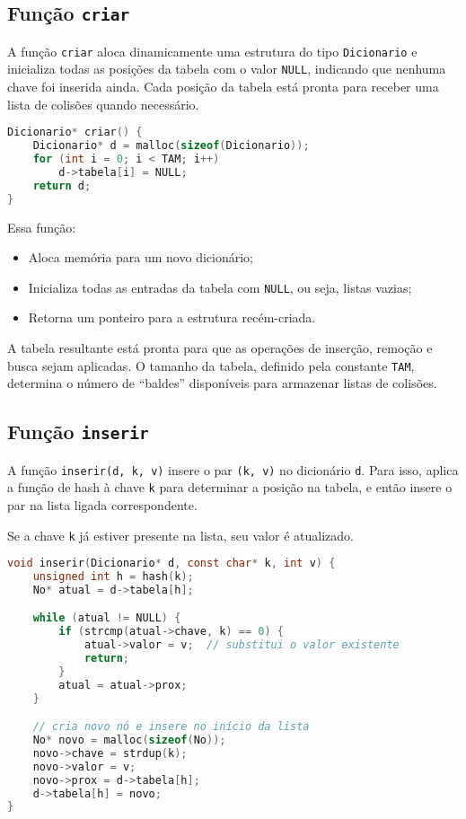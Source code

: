 \subsection*{Função \texttt{criar}}

A função \texttt{criar} aloca dinamicamente uma estrutura do tipo \texttt{Dicionario} e inicializa todas as posições da tabela com o valor \texttt{NULL}, indicando que nenhuma chave foi inserida ainda. 
Cada posição da tabela está pronta para receber uma lista de colisões quando necessário.

\begin{lstlisting}[language=C, caption={Criação de um dicionário vazio}]
Dicionario* criar() {
    Dicionario* d = malloc(sizeof(Dicionario));
    for (int i = 0; i < TAM; i++)
        d->tabela[i] = NULL;
    return d;
}
\end{lstlisting}

Essa função:

\begin{itemize}
  \item Aloca memória para um novo dicionário;
  \item Inicializa todas as entradas da tabela com \texttt{NULL}, ou seja, listas vazias;
  \item Retorna um ponteiro para a estrutura recém-criada.
\end{itemize}

A tabela resultante está pronta para que as operações de inserção, remoção e busca sejam aplicadas. 
O tamanho da tabela, definido pela constante \texttt{TAM}, determina o número de ``baldes'' disponíveis para armazenar listas de colisões.

\subsection*{Função \texttt{inserir}}

A função \texttt{inserir(d, k, v)} insere o par \texttt{(k, v)} no dicionário \texttt{d}. 
Para isso, aplica a função de hash à chave \texttt{k} para determinar a posição na tabela, e então insere o par na lista ligada correspondente.

Se a chave \texttt{k} já estiver presente na lista, seu valor é atualizado.

\begin{lstlisting}[language=C, caption={Inserção de um par (k, v) na tabela}]
void inserir(Dicionario* d, const char* k, int v) {
    unsigned int h = hash(k);
    No* atual = d->tabela[h];

    while (atual != NULL) {
        if (strcmp(atual->chave, k) == 0) {
            atual->valor = v;  // substitui o valor existente
            return;
        }
        atual = atual->prox;
    }

    // cria novo nó e insere no início da lista
    No* novo = malloc(sizeof(No));
    novo->chave = strdup(k);
    novo->valor = v;
    novo->prox = d->tabela[h];
    d->tabela[h] = novo;
}
\end{lstlisting}

